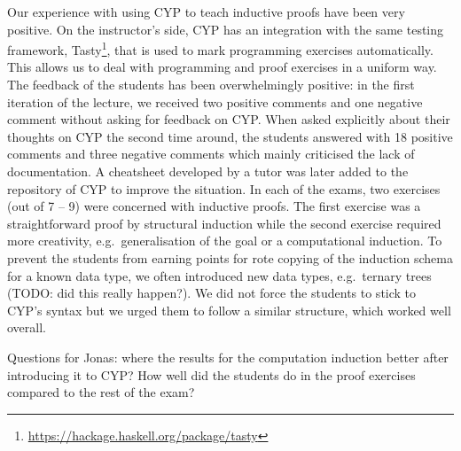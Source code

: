 Our experience with using CYP to teach inductive proofs have been very positive.
On the instructor's side, CYP has an integration with the same testing framework, Tasty\footnote{\url{https://hackage.haskell.org/package/tasty}}, that is used to mark programming exercises automatically.
This allows us to deal with programming and proof exercises in a uniform way.
The feedback of the students has been overwhelmingly positive:
in the first iteration of the lecture, we received two positive comments and one negative comment without asking for feedback on CYP.
When asked explicitly about their thoughts on CYP the second time around, the students answered with 18 positive comments and three negative comments which mainly criticised the lack of documentation.
A cheatsheet developed by a tutor was later added to the repository of CYP to improve the situation.
In each of the exams, two exercises (out of 7 -- 9) were concerned with inductive proofs.
The first exercise was a straightforward proof by structural induction while the second exercise required more creativity, e.g.\ generalisation of the goal or a computational induction.
To prevent the students from earning points for rote copying of the induction schema for a known data type, we often introduced new data types, e.g.\ ternary trees (TODO: did this really happen?). 
We did not force the students to stick to CYP's syntax but we urged them to follow a similar structure, which worked well overall.

Questions for Jonas: where the results for the computation induction better after introducing it to CYP? How well did the students do in the proof exercises compared to the rest of the exam?

